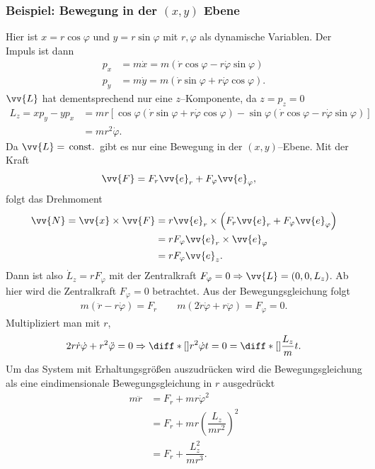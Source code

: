 \documentclass[a4paper,12pt]{article}
\numberwithin{equation}{section}
\begin{document}
\subsubsection{Beispiel: Bewegung in der $(x,y)$ Ebene}
Hier ist $x=r\cos \varphi $ und $y=r\sin \varphi $ mit $r,\varphi $ als dynamische Variablen. Der Impuls ist dann
\begin{align*}
        p_x&=m\dot{x}=m\left(\dot{r}\cos \varphi -r\dot{\varphi }\sin \varphi \right)\\
        p_y&=m\dot{y}=m\left(\dot{r}\sin \varphi +r\dot{\varphi }\cos \varphi \right)
.\end{align*}
$\vv{L}$ hat dementsprechend nur eine $z$--Komponente, da $z=p_z=0$
\begin{align*}
        L_z=xp_y-yp_x&=mr\left[\cos \varphi \left(\dot{r}\sin \varphi +r\dot{\varphi }\cos \varphi \right)-\sin \varphi \left(\dot{r}\cos \varphi -r\dot{\varphi }\sin \varphi \right)\right]\\
                     &=mr^2\dot{\varphi }
.\end{align*}
Da $\vv{L}=\,\text{const.}\,$ gibt es nur eine Bewegung in der $(x,y)$--Ebene. Mit der Kraft
\begin{align*}
        \vv{F}&=F_r\vv{e}_r+F_\varphi \vv{e}_\varphi 
,\end{align*}
folgt das Drehmoment
\begin{align*}
        \vv{N}=\vv{x}\times \vv{F}&=r\vv{e}_r\times \left(F_r\vv{e}_r+F_\varphi \vv{e}_\varphi \right)\\
                                  &=rF_\varphi \vv{e}_r\times \vv{e}_\varphi \\
                                  &=rF_\varphi \vv{e}_z
.\end{align*}
Dann ist also $\dot{L}_z=rF_\varphi $ mit der Zentralkraft $F_\varphi =0\Rightarrow \vv{L}=\left(0,0,L_z\right)$. Ab hier wird die Zentralkraft $F_\varphi =0$ betrachtet. Aus der Bewegungsgleichung folgt
\begin{align*}
        m\left(\ddot{r}-r\dot{\varphi }\right)=F_r\qquad m\left(2\dot{r}\dot{\varphi }+r\ddot{\varphi }\right)=F_\varphi =0
.\end{align*}
Multipliziert man mit $r$,
\[ 
        2r\dot{r}\dot{\varphi }+r^2\ddot{\varphi }=0\Rightarrow \diff*[]{r^2\dot{\varphi }}{t}=0=\diff*[]{\dfrac{L_z}{m}}{t}
.\] 
Um das System mit Erhaltungsgrößen auszudrücken wird die Bewegungsgleichung als eine eindimensionale Bewegungsgleichung in $r$ ausgedrückt
\begin{align*}
        m\ddot{r}&=F_r+mr\dot{\varphi }^2\\
                 &=F_r+mr\left(\dfrac{L_z}{mr^2}\right)^2\\
                 &=F_r+\dfrac{L_z^2}{mr^3}
.\end{align*}
\end{document}

